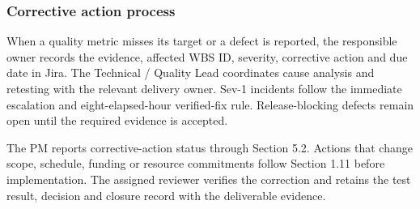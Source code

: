 \subsubsection{Corrective action process}\label{sec:corrective-action-process}
When a quality metric misses its target or a defect is reported, the responsible owner records the evidence, affected WBS ID, severity, corrective action and due date in Jira. The Technical /\allowbreak{} Quality Lead coordinates cause analysis and retesting with the relevant delivery owner. Sev-1 incidents follow the immediate escalation and eight-elapsed-hour verified-fix rule. Release-blocking defects remain open until the required evidence is accepted.


The PM reports corrective-action status through Section 5.2. Actions that change scope, schedule, funding or resource commitments follow Section 1.11 before implementation. The assigned reviewer verifies the correction and retains the test result, decision and closure record with the deliverable evidence.
